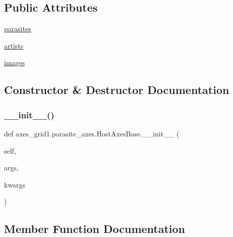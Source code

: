 \subsection*{Public Attributes}
\begin{DoxyCompactItemize}
\item 
\hyperlink{classaxes__grid1_1_1parasite__axes_1_1HostAxesBase_aa206c72c78a35fe4b06b301e4135bc87}{parasites}
\item 
\hyperlink{classaxes__grid1_1_1parasite__axes_1_1HostAxesBase_a3e676e7d6b4ccce1d2dbd8f3a0b9dad8}{artists}
\item 
\hyperlink{classaxes__grid1_1_1parasite__axes_1_1HostAxesBase_a7a73e4a01778c5322da613e62cf6880d}{images}
\end{DoxyCompactItemize}


\subsection{Constructor \& Destructor Documentation}
\mbox{\label{classaxes__grid1_1_1parasite__axes_1_1HostAxesBase_a1e72f13a79a19034f551f037ddb29eb0}} 
\subsubsection{\texorpdfstring{\+\_\+\+\_\+init\+\_\+\+\_\+()}{\_\_init\_\_()}}
{\footnotesize\ttfamily def axes\+\_\+grid1.\+parasite\+\_\+axes.\+Host\+Axes\+Base.\+\_\+\+\_\+init\+\_\+\+\_\+ (\begin{DoxyParamCaption}\item[{}]{self,  }\item[{}]{args,  }\item[{}]{kwargs }\end{DoxyParamCaption})}



\subsection{Member Function Documentation}
\mbox{\label{classaxes__grid1_1_1parasite__axes_1_1HostAxesBase_a144d0996bc8b36a3d6f050166f540d0e}} 
